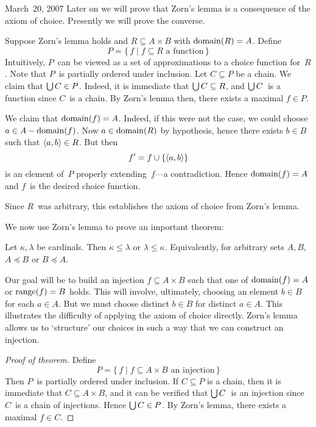 \begin{lecture}{March~20, 2007}
Later on we will prove that Zorn's lemma is a consequence of the axiom of choice. Presently we will prove the converse.

Suppose Zorn's lemma holds and \(R\subseteq A\times B\) with \(\operatorname{domain}(R)=A\). Define
\[P=\{\,f\mid f\subseteq R\text{ a function}\,\}\]
Intuitively, \(P\)~can be viewed as a set of approximations to a choice function for~\(R\). Note that \(P\)~is partially ordered under inclusion. Let \(C\subseteq P\) be a chain. We claim that \(\bigcup C\in P\). Indeed, it is immediate that \(\bigcup C\subseteq R\), and \(\bigcup C\)~is a function since \(C\)~is a chain. By Zorn's lemma then, there exists a maximal \(f\in P\).

We claim that \(\operatorname{domain}(f)=A\). Indeed, if this were not the case, we could choose \(a\in A-\operatorname{domain}(f)\). Now \(a\in\operatorname{domain}(R)\) by hypothesis, hence there exists \(b\in B\) such that \(\langle{a},{b}\rangle\in R\). But then
\[f'=f\cup\{\langle{a},{b}\rangle\}\]
is an element of~\(P\) properly extending~\(f\)---a contradiction. Hence \(\operatorname{domain}(f)=A\) and \(f\)~is the desired choice function.

Since \(R\)~was arbitrary, this establishes the axiom of choice from Zorn's lemma.

We now use Zorn's lemma to prove an important theorem:
\begin{thm}
Let \(\kappa,\lambda\) be cardinals. Then \(\kappa\le\lambda\) or \(\lambda\le\kappa\). Equivalently, for arbitrary sets \(A,B\), \(A\preceq B\) or \(B\preceq A\).
\end{thm}
Our goal will be to build an injection \(f\subseteq A\times B\) such that one of \(\operatorname{domain}(f)=A\) or \(\operatorname{range}(f)=B\) holds. This will involve, ultimately, choosing an element \(b\in B\) for each \(a\in A\). But we must choose distinct \(b\in B\) for distinct \(a\in A\). This illustrates the difficulty of applying the axiom of choice directly. Zorn's lemma allows us to `structure' our choices in such a way that we can construct an injection.
\begin{proof}[Proof of theorem]
Define
\[P=\{\,f\mid f\subseteq A\times B\text{ an injection}\,\}\]
Then \(P\)~is partially ordered under inclusion. If \(C\subseteq P\) is a chain, then it is immediate that \(C\subseteq A\times B\), and it can be verified that \(\bigcup C\)~is an injection since \(C\)~is a chain of injections. Hence \(\bigcup C\in P\). By Zorn's lemma, there exists a maximal \(f\in C\).


\end{proof}
\end{lecture}
